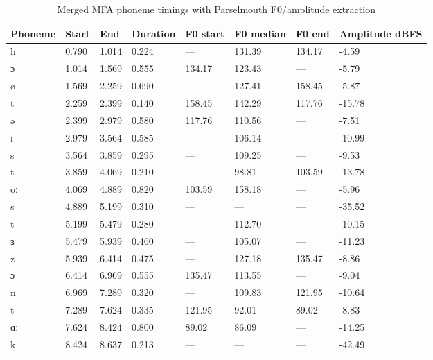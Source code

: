 \begin{table}[h]
\centering
\caption{Merged MFA phoneme timings with Parselmouth F0/amplitude extraction}
\begin{tabular}{llllllll}
\hline
Phoneme & Start & End & Duration & F0 start & F0 median & F0 end & Amplitude dBFS \\
\hline
h   & 0.790 & 1.014 & 0.224 & --- & 131.39 & 134.17 & -4.59 \\
ɔ   & 1.014 & 1.569 & 0.555 & 134.17 & 123.43 & --- & -5.79 \\
ø   & 1.569 & 2.259 & 0.690 & --- & 127.41 & 158.45 & -5.87 \\
t   & 2.259 & 2.399 & 0.140 & 158.45 & 142.29 & 117.76 & -15.78 \\
ə   & 2.399 & 2.979 & 0.580 & 117.76 & 110.56 & --- & -7.51 \\
ɪ   & 2.979 & 3.564 & 0.585 & --- & 106.14 & --- & -10.99 \\
s   & 3.564 & 3.859 & 0.295 & --- & 109.25 & --- & -9.53 \\
t   & 3.859 & 4.069 & 0.210 & --- & 98.81 & 103.59 & -13.78 \\
oː  & 4.069 & 4.889 & 0.820 & 103.59 & 158.18 & --- & -5.96 \\
s   & 4.889 & 5.199 & 0.310 & --- & --- & --- & -35.52 \\
t   & 5.199 & 5.479 & 0.280 & --- & 112.70 & --- & -10.15 \\
ɜ   & 5.479 & 5.939 & 0.460 & --- & 105.07 & --- & -11.23 \\
z   & 5.939 & 6.414 & 0.475 & --- & 127.18 & 135.47 & -8.86 \\
ɔ   & 6.414 & 6.969 & 0.555 & 135.47 & 113.55 & --- & -9.04 \\
n   & 6.969 & 7.289 & 0.320 & --- & 109.83 & 121.95 & -10.64 \\
t   & 7.289 & 7.624 & 0.335 & 121.95 & 92.01 & 89.02 & -8.83 \\
ɑː  & 7.624 & 8.424 & 0.800 & 89.02 & 86.09 & --- & -14.25 \\
k   & 8.424 & 8.637 & 0.213 & --- & --- & --- & -42.49 \\
\hline
\end{tabular}
\label{tab:mfa_example}
\end{table}
